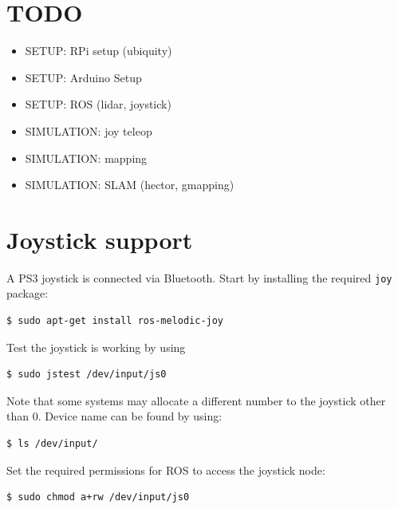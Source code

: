 \section{TODO}
\begin{itemize}
    \item SETUP: RPi setup (ubiquity)
    \item SETUP: Arduino Setup
    \item SETUP: ROS (lidar, joystick)
    \item SIMULATION: joy teleop
    \item SIMULATION: mapping
    \item SIMULATION: SLAM (hector, gmapping)
    
\end{itemize}

\section{Joystick support}
\label{section:install_joystick}
\noindent A PS3 joystick is connected via Bluetooth. Start by installing the required \texttt{joy} package:
\begin{mdframed}[backgroundcolor=light-gray, linecolor=light-gray]
\begin{verbatim}
$ sudo apt-get install ros-melodic-joy
\end{verbatim}
\end{mdframed}

\noindent Test the joystick is working by using
\begin{mdframed}[backgroundcolor=light-gray, linecolor=light-gray]
\begin{verbatim}
$ sudo jstest /dev/input/js0
\end{verbatim}
\end{mdframed}

\noindent Note that some systems may allocate a different number to the joystick other than 0. Device name can be found by using:
\begin{mdframed}[backgroundcolor=light-gray, linecolor=light-gray]
\begin{verbatim}
$ ls /dev/input/
\end{verbatim}
\end{mdframed}

\noindent Set the required permissions for ROS to access the joystick node:
\begin{mdframed}[backgroundcolor=light-gray, linecolor=light-gray]
\begin{verbatim}
$ sudo chmod a+rw /dev/input/js0
\end{verbatim}
\end{mdframed}


